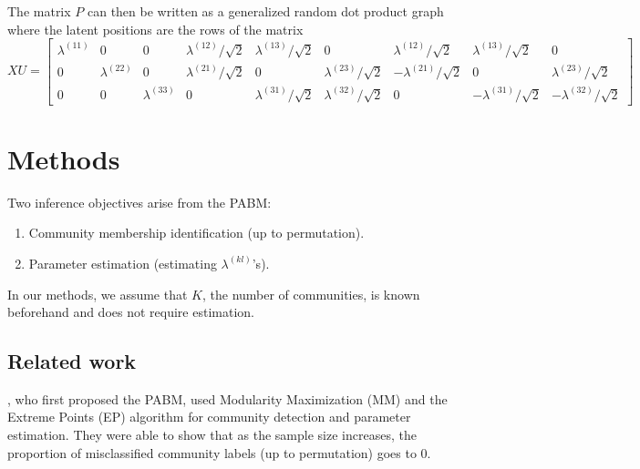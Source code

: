 \documentclass[12pt]{article}
\providecommand{\tightlist}{%
  \setlength{\itemsep}{0pt}\setlength{\parskip}{0pt}}
\begin{document}
\begin{example}[$K = 3$]
The matrix $P$ can then be written as a generalized random dot product
graph where the latent positions are the rows of the matrix
$$XU = \begin{bmatrix}
  \lambda^{(11)} & 0 & 0 & 
  \lambda^{(12)} / \sqrt{2} & \lambda^{(13)} / \sqrt{2} & 0 & 
  \lambda^{(12)} / \sqrt{2} & \lambda^{(13)} / \sqrt{2} & 0 \\
  0 & \lambda^{(22)} & 0 & 
  \lambda^{(21)} / \sqrt{2} & 0 & \lambda^{(23)} / \sqrt{2} & 
  -\lambda^{(21)} / \sqrt{2} & 0 & \lambda^{(23)} / \sqrt{2} \\
  0 & 0 & \lambda^{(33)} & 
  0 & \lambda^{(31)} / \sqrt{2} & \lambda^{(32)} / \sqrt{2} & 
  0 & -\lambda^{(31)} / \sqrt{2} & -\lambda^{(32)} / \sqrt{2}
\end{bmatrix}$$
\end{example}

\hypertarget{methods}{%
\section{Methods}\label{methods}}

Two inference objectives arise from the PABM:

\begin{enumerate}
\def\labelenumi{\arabic{enumi}.}
\tightlist
\item
  Community membership identification (up to permutation).
\item
  Parameter estimation (estimating \(\lambda^{(kl)}\)'s).
\end{enumerate}

In our methods, we assume that \(K\), the number of communities, is
known beforehand and does not require estimation.

\hypertarget{related-work}{%
\subsection{Related work}\label{related-work}}

\citeauthor{307cbeb9b1be48299388437423d94bf1}, who first proposed the
PABM, used Modularity Maximization (MM) and the Extreme Points (EP)
algorithm \cite{le2016} for community detection and parameter
estimation. They were able to show that as the sample size increases,
the proportion of misclassified community labels (up to permutation)
goes to 0.
\end{document}
